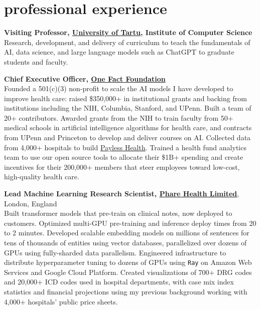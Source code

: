 \documentclass[4pt, letterpaper]{article}
\begin{document}
\section*{professional experience}
\textbf{Visiting Professor, \href{https://ut.ee/en}{University of Tartu}, Institute of Computer Science}\\
Research, development, and delivery of curriculum to teach the fundamentals of AI, data science, and large language models such as ChatGPT to graduate students and faculty. 

\textbf{Chief Executive Officer, \href{https://onefact.org}{One Fact Foundation}}\\
Founded a 501(c)(3) non-profit to scale the AI models I have developed to improve health care: raised \$350,000+ in institutional grants and backing from institutions including the NIH, Columbia, Stanford, and UPenn. Built a team of 20+ contributors. Awarded grants from the NIH to train faculty from 50+ medical schools in artificial intelligence algorithms for health care, and contracts from UPenn and Princeton to develop and deliver courses on AI. Collected data from 4,000+ hospitals to build \href{https://www.payless.health/}{Payless Health}. Trained a health fund analytics team to use our open source tools to allocate their \$1B+ spending and create incentives for their 200,000+ members that steer employees toward low-cost, high-quality health care. 

\textbf{Lead Machine Learning Research Scientist, \href{https://pharehealth.com}{Phare Health Limited}}, London, England\\
Built transformer models that pre-train on clinical notes, now deployed to customers. Optimized multi-GPU pre-training and inference deploy times from 20 to 2 minutes. Developed scalable embedding models on millions of sentences for tens of thousands of entities using vector databases, parallelized over dozens of GPUs using fully-sharded data parallelism. Engineered infrastructure to distribute hyperparameter tuning to dozens of GPUs using \texttt{Ray} on Amazon Web Services and Google Cloud Platform. Created visualizations of 700+ DRG codes and 20,000+ ICD codes used in hospital departments, with case mix index statistics and financial projections using my previous background working with 4,000+ hospitals' public price sheets.
\end{document}
